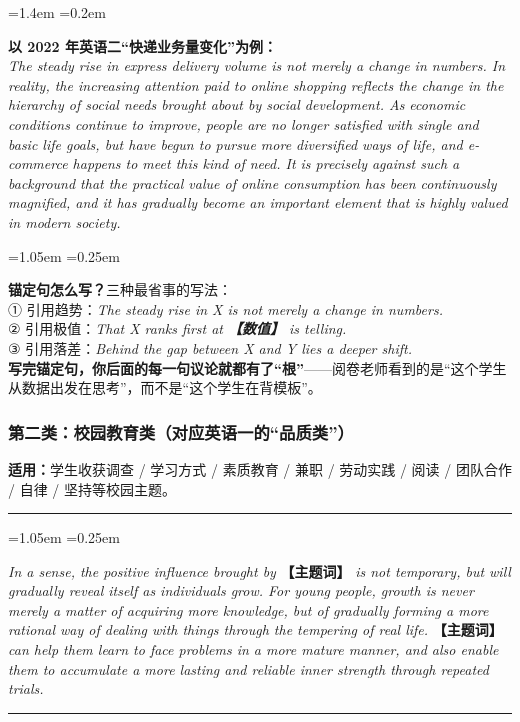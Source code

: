 \documentclass[11pt,a4paper]{ctexart}
\newcommand{\fillin}[1]{{\bfseries【#1】}}
\newcommand{\en}[1]{\textit{#1}}
\newenvironment{tpl}[1]{%
  \par\addvspace{7pt}\needspace{4\baselineskip}%
  \noindent{\bfseries\color{accent}#1}\par\nopagebreak
  \vspace{2pt}\noindent\rule{\linewidth}{0.7pt}\par\nopagebreak\vspace{3pt}%
  \begin{list}{}{\leftmargin=1.05em \rightmargin=0.25em \listparindent=0pt
    \itemindent=0pt \topsep=0pt \parsep=2.5pt \itemsep=2.5pt \partopsep=0pt}%
  \item\relax
}{%
  \end{list}\vspace{1pt}\noindent\rule{\linewidth}{0.7pt}\par\addvspace{8pt}%
}
\newenvironment{note}{%
  \par\addvspace{5pt}%
  \begin{list}{}{\leftmargin=1.05em \rightmargin=0.25em \listparindent=0pt
    \itemindent=0pt \topsep=0pt \parsep=2pt \itemsep=2pt \partopsep=0pt}%
  \item\relax\small\color{ink}%
}{%
  \end{list}\addvspace{5pt}%
}
\newenvironment{eg}{%
  \par\addvspace{4pt}%
  \begin{list}{}{\leftmargin=1.4em \rightmargin=0.2em \listparindent=0pt
    \itemindent=0pt \topsep=0pt \parsep=2pt \itemsep=2pt \partopsep=0pt}%
  \item\relax
}{%
  \end{list}\addvspace{5pt}%
}
\begin{document}
\begin{eg}
\textbf{以 2022 年英语二“快递业务量变化”为例：}\\
\en{The steady rise in express delivery volume is not merely a change in numbers. In reality, the increasing attention paid to online shopping reflects the change in the hierarchy of social needs brought about by social development. As economic conditions continue to improve, people are no longer satisfied with single and basic life goals, but have begun to pursue more diversified ways of life, and e-commerce happens to meet this kind of need. It is precisely against such a background that the practical value of online consumption has been continuously magnified, and it has gradually become an important element that is highly valued in modern society.}
\end{eg}

\begin{note}
\textbf{锚定句怎么写？}三种最省事的写法：\\
① 引用趋势：\en{The steady rise in X is not merely a change in numbers.}\\
② 引用极值：\en{That X ranks first at \fillin{数值} is telling.}\\
③ 引用落差：\en{Behind the gap between X and Y lies a deeper shift.}\\
\textbf{写完锚定句，你后面的每一句议论就都有了“根”}——阅卷老师看到的是“这个学生从数据出发在思考”，而不是“这个学生在背模板”。
\end{note}

\subsubsection{第二类：校园教育类（对应英语一的“品质类”）}

\textbf{适用：}学生收获调查 / 学习方式 / 素质教育 / 兼职 / 劳动实践 / 阅读 / 团队合作 / 自律 / 坚持等校园主题。

\begin{tpl}{校园教育类 · 正面（mmg 原文 + 本册修正）}
\en{In a sense, the positive influence brought by} \fillin{主题词} \en{is not temporary, but will gradually reveal itself as individuals grow. For young people, growth is never merely a matter of acquiring more knowledge, but of gradually forming a more rational way of dealing with things through the tempering of real life.} \fillin{主题词} \en{can help them learn to face problems in a more mature manner, and also enable them to accumulate a more lasting and reliable inner strength through repeated trials.}
\end{tpl}
\end{document}
